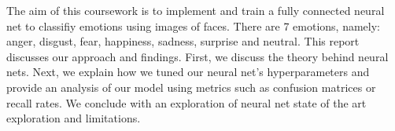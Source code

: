 The aim of this coursework is to implement and train a fully connected neural net to classifiy emotions using images of faces.
There are 7 emotions, namely: anger, disgust, fear, happiness, sadness, surprise and neutral.
This report discusses our approach and findings.
First, we discuss the theory behind neural nets.
Next, we explain how we tuned our neural net's hyperparameters
and provide an analysis of our model using metrics such as confusion matrices or recall rates.
We conclude with an exploration of neural net state of the art exploration and limitations.

